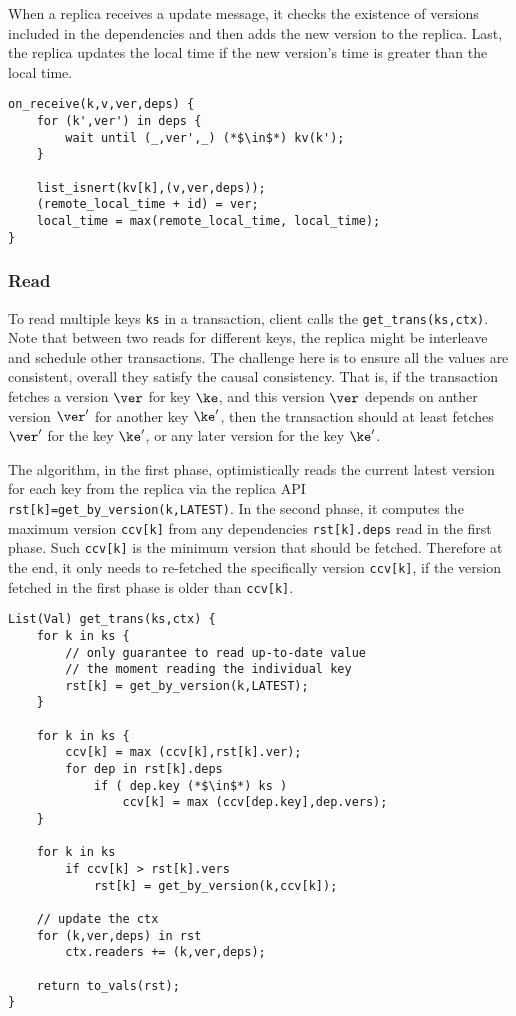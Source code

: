 When a replica receives a update message, it checks the existence of versions included in the dependencies and then adds the new version to the replica.
Last, the replica updates the local time if the new version's time is greater than the local time.


\begin{lstlisting}[caption={Receive update message},label={lst:cops-replica-receive-msg}]
on_receive(k,v,ver,deps) {
    for (k',ver') in deps {
        wait until (_,ver',_) (*$\in$*) kv(k');
    }

    list_isnert(kv[k],(v,ver,deps));
    (remote_local_time + id) = ver;
    local_time = max(remote_local_time, local_time);
}
\end{lstlisting}


\subsubsection{Read}

To read multiple keys \verb|ks| in a transaction, client calls the \verb|get_trans(ks,ctx)|.
Note that between two reads for different keys, 
the replica might be interleave and schedule other transactions.
The challenge here is to ensure all the values are consistent, \ie
overall they satisfy the causal consistency.
That is, if the transaction fetches a version \( \ver \) for key \( \ke \),
and this version \( \ver \) depends on anther version \( \ver' \) for another key \( \ke' \), 
then the transaction should at least fetches \( \ver' \) for the key \( \ke' \),
or any later version  for the key \( \ke' \).

The algorithm, in the first phase, optimistically reads the current latest version for each key from the replica via the replica API \verb|rst[k]=get_by_version(k,LATEST)|.
In the second phase, it computes the maximum version \verb|ccv[k]| from any dependencies \verb|rst[k].deps| read in the first phase.
Such \verb|ccv[k]| is the minimum version that should be fetched.
Therefore at the end, it only needs to re-fetched the specifically version \verb|ccv[k]|,
if the version fetched in the first phase is older than \verb|ccv[k]|.

\begin{lstlisting}[caption={Receive update message},label={lst:cops-replica-receive-msg}]
List(Val) get_trans(ks,ctx) {
    for k in ks {
        // only guarantee to read up-to-date value 
        // the moment reading the individual key
        rst[k] = get_by_version(k,LATEST);
    }

    for k in ks {
        ccv[k] = max (ccv[k],rst[k].ver);
        for dep in rst[k].deps
            if ( dep.key (*$\in$*) ks )
                ccv[k] = max (ccv[dep.key],dep.vers);
    }

    for k in ks 
        if ccv[k] > rst[k].vers
            rst[k] = get_by_version(k,ccv[k]);

    // update the ctx
    for (k,ver,deps) in rst
        ctx.readers += (k,ver,deps);

    return to_vals(rst);
}                                   
\end{lstlisting}

